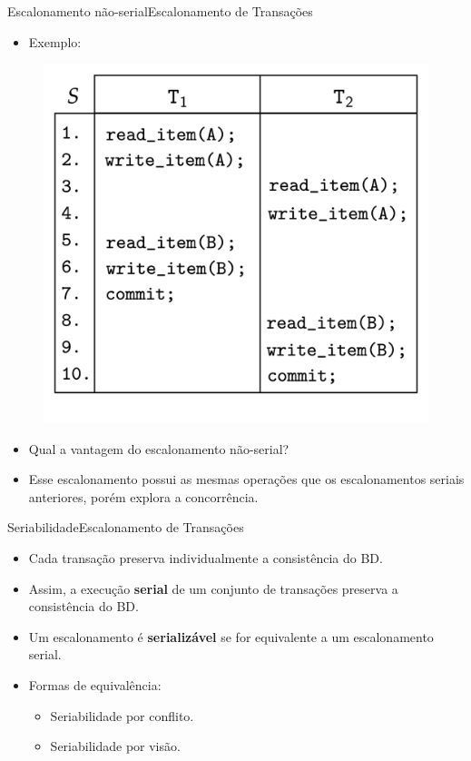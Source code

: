 \documentclass[t]{beamer}
\begin{document}
\begin{ftst}{Escalonamento não-serial}{Escalonamento de Transações}

\begin{itemize}
    \item Exemplo:
\end{itemize}
\begin{figure}
    \centering
    \includegraphics[scale=0.12]{Figuras_transacoes/14.png}
\end{figure}
\small
\begin{itemize}
    \item Qual a vantagem do escalonamento não-serial?
    \item Esse escalonamento possui as mesmas operações que os escalonamentos seriais anteriores, porém explora a concorrência.
\end{itemize}
\end{ftst}


\begin{ftst}{Seriabilidade}{Escalonamento de Transações}

\begin{itemize}
    \item Cada transação preserva individualmente a consistência do BD.
    \item Assim, a execução \textbf{serial} de um conjunto de transações preserva a consistência do BD.
    \item Um escalonamento é \textbf{serializável} se for equivalente a um escalonamento serial.
    \item Formas de equivalência:
    \begin{itemize}
        \item Seriabilidade por conflito.
        \item Seriabilidade por visão.
    \end{itemize}
\end{itemize}

\end{ftst}
\end{document}
